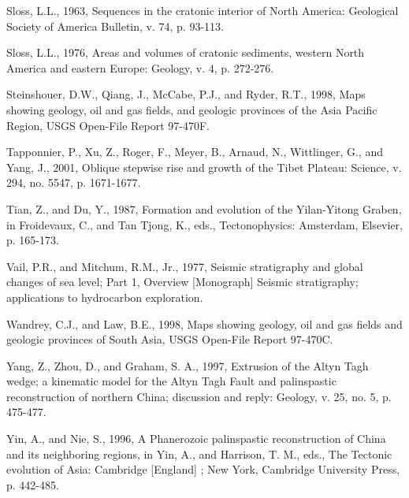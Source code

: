 \documentclass{article}
\begin{document}
\begin{description}
 \item Sloss, L.L., 1963, Sequences  in the cratonic interior of North
 America: Geological Society of America Bulletin, v. 74, p. 93-113.\\

 \item  Sloss, L.L., 1976,  Areas and  volumes of  cratonic sediments,
 western   North  America   and   eastern  Europe:   Geology,  v.   4,
 p. 272-276.\\

 \item Steinshouer,  D.W., Qiang, J.,  McCabe, P.J., and  Ryder, R.T.,
 1998,  Maps  showing  geology,  oil  and  gas  fields,  and  geologic
 provinces  of   the  Asia  Pacific  Region,   USGS  Open-File  Report
 97-470F.\\

 \item  Tapponnier, P.,  Xu, Z.,  Roger,  F., Meyer,  B., Arnaud,  N.,
 Wittlinger, G., and Yang, J.,  2001, Oblique stepwise rise and growth
 of the Tibet Plateau: Science, v. 294, no. 5547, p. 1671-1677.\\

 \item  Tian, Z., and  Du, Y.,  1987, Formation  and evolution  of the
 Yilan-Yitong  Graben, in  Froidevaux, C.,  and Tan  Tjong,  K., eds.,
 Tectonophysics: Amsterdam, Elsevier, p. 165-173.\\

 \item Vail, P.R., and  Mitchum, R.M., Jr., 1977, Seismic stratigraphy
 and global changes of sea level; Part 1, Overview [Monograph] Seismic
 stratigraphy; applications to hydrocarbon exploration.\\

 \item Wandrey, C.J.,  and Law, B.E., 1998, Maps  showing geology, oil
 and gas fields  and geologic provinces of South  Asia, USGS Open-File
 Report 97-470C.\\

 \item Yang, Z.,  Zhou, D., and Graham, S. A.,  1997, Extrusion of the
 Altyn  Tagh wedge; a  kinematic model  for the  Altyn Tagh  Fault and
 palinspastic reconstruction of  northern China; discussion and reply:
 Geology, v. 25, no. 5, p. 475-477.\\

 \item  Yin,  A.,  and  Nie,  S.,  1996,  A  Phanerozoic  palinspastic
 reconstruction of China and its  neighboring regions, in Yin, A., and
 Harrison,  T. M.,  eds., The  Tectonic evolution  of  Asia: Cambridge
 [England] ; New York, Cambridge University Press, p. 442-485.\\


\end{description}
\end{document}
